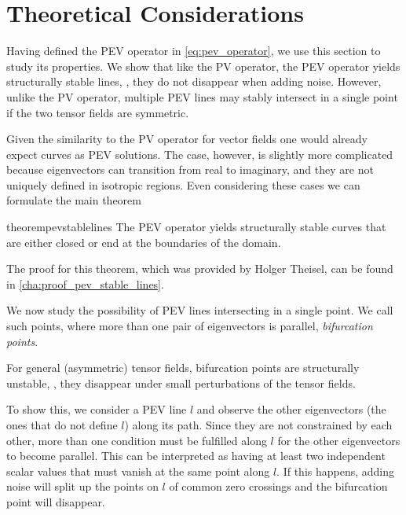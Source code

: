\section{Theoretical Considerations} %
\label{sec:pev_theory}
%
Having defined the \ac{PEV} operator in \cref{eq:pev_operator}, we use this
section to study its properties.
%
We show that like the \ac{PV} operator, the \ac{PEV} operator yields
structurally stable lines, \ie, they do not disappear when adding noise.
%
However, unlike the \ac{PV} operator, multiple \ac{PEV} lines may stably
intersect in a single point if the two tensor fields are symmetric.
% 

%
Given the similarity to the \ac{PV} operator for vector fields one would
already expect curves as \ac{PEV} solutions.
%
The case, however, is slightly more complicated because eigenvectors can
transition from real to imaginary, and they are not uniquely defined in
isotropic regions.
%
Even considering these cases we can formulate the main theorem
%
\begin{restatable}{theorem}{pevstablelines}
    \label{thm:pev_stable_lines}%
    The \ac{PEV} operator yields structurally stable curves that are either
    closed or end at the boundaries of the domain.
\end{restatable}
%
The proof for this theorem, which was provided by Holger Theisel, can be found
in \cref{cha:proof_pev_stable_lines}.
%

%
We now study the possibility of \ac{PEV} lines intersecting in a single point.
%
We call such points, where more than one pair of eigenvectors is parallel,
\emph{bifurcation points}.
%
\begin{theorem}\label{pev_bifurcation_unstable}
    For general (asymmetric) tensor fields, bifurcation points are structurally
    unstable, \ie, they disappear under small perturbations of the tensor
    fields.
\end{theorem}
%
To show this, we consider a \ac{PEV} line $l$ and observe the other eigenvectors
(the ones that do not define $l$) along its path.
%
Since they are not constrained by each other, more than one condition must be
fulfilled along $l$ for the other eigenvectors to become parallel.
%
This can be interpreted as having at least two independent scalar values that
must vanish at the same point along $l$.
%
If this happens, adding noise will split up the points on $l$ of common zero
crossings and the bifurcation point will disappear.
%

